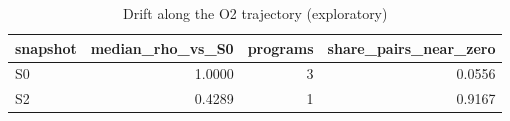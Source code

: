 \begin{table}[t]
\centering
\caption{Drift along the O2 trajectory (exploratory)}
\label{tab:v3-1-drift-decay}
\begin{tabular}{lrrr}
\toprule
snapshot & median\_rho\_vs\_S0 & programs & share\_pairs\_near\_zero \\
\midrule
S0 & 1.0000 & 3 & 0.0556 \\
S2 & 0.4289 & 1 & 0.9167 \\
\bottomrule
\end{tabular}
\end{table}
